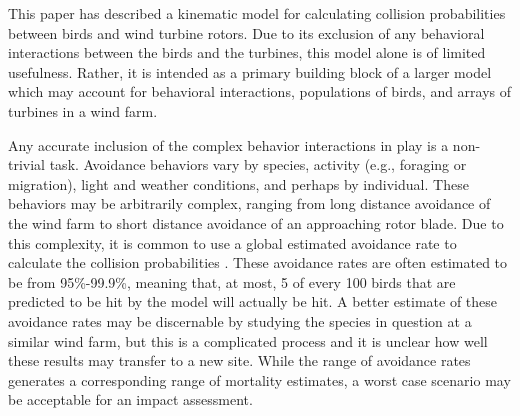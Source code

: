 \documentclass[10pt,conference]{IEEEtran}
\begin{document}
This paper has described a kinematic model for calculating collision probabilities between birds and wind turbine
rotors. Due to its exclusion of any behavioral interactions between the birds and the turbines, this model alone is of
limited usefulness. Rather, it is intended as a primary building block of a larger model which may account for
behavioral interactions, populations of birds, and arrays of turbines in a wind farm.

Any accurate inclusion of the complex behavior interactions in play is a non-trivial task. Avoidance behaviors vary by
species, activity (e.g., foraging or migration), light and weather conditions, and perhaps by individual. These
behaviors may be arbitrarily complex, ranging from long distance avoidance of the wind farm to short distance avoidance
of an approaching rotor blade. Due to this complexity, it is common to use a global estimated avoidance rate to
calculate the collision probabilities \cite{Cooper2004}\cite{Podolsky2005}. These avoidance rates are often estimated
to be from 95\%-99.9\%, meaning that, at most, 5 of every 100 birds that are predicted to be hit by the model will
actually be hit. A better estimate of these avoidance rates may be discernable by studying the species in question at a
similar wind farm, but this is a complicated process and it is unclear how well these results may transfer to a new
site. While the range of avoidance rates generates a corresponding range of mortality estimates, a worst case scenario
may be acceptable for an impact assessment.




\end{document}
